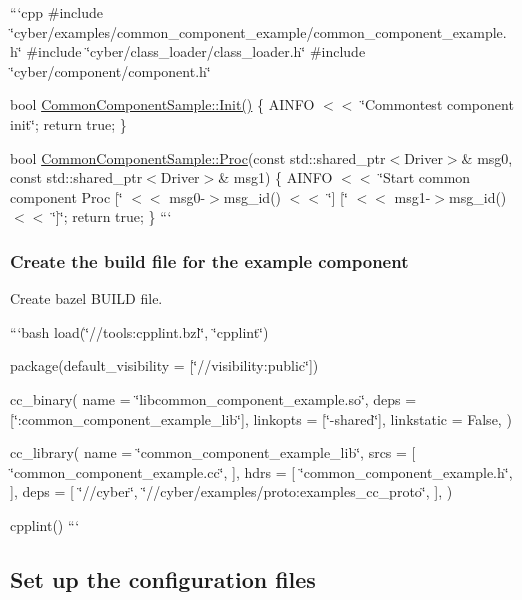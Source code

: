 ```cpp \#include \char`\"{}cyber/examples/common\-\_\-component\-\_\-example/common\-\_\-component\-\_\-example.\-h\char`\"{} \#include \char`\"{}cyber/class\-\_\-loader/class\-\_\-loader.\-h\char`\"{} \#include \char`\"{}cyber/component/component.\-h\char`\"{}

bool \hyperlink{classCommonComponentSample_ae2a3f8c8ce4b9cfd9c6b357628bc84ee}{Common\-Component\-Sample\-::\-Init()} \{ A\-I\-N\-F\-O $<$$<$ \char`\"{}\-Commontest component init\char`\"{}; return true; \}

bool \hyperlink{classCommonComponentSample_ab84ea2f74b8ab92a74733b392319ea5e}{Common\-Component\-Sample\-::\-Proc}(const std\-::shared\-\_\-ptr$<$\-Driver$>$\& msg0, const std\-::shared\-\_\-ptr$<$\-Driver$>$\& msg1) \{ A\-I\-N\-F\-O $<$$<$ \char`\"{}\-Start common component Proc \mbox{[}\char`\"{} $<$$<$ msg0-\/$>$msg\-\_\-id() $<$$<$ \char`\"{}\mbox{]} \mbox{[}\char`\"{} $<$$<$ msg1-\/$>$msg\-\_\-id() $<$$<$ \char`\"{}\mbox{]}\char`\"{}; return true; \} ```

\subsubsection*{Create the build file for the example component}

Create bazel B\-U\-I\-L\-D file.

```bash load(\char`\"{}//tools\-:cpplint.\-bzl\char`\"{}, \char`\"{}cpplint\char`\"{})

package(default\-\_\-visibility = \mbox{[}\char`\"{}//visibility\-:public\char`\"{}\mbox{]})

cc\-\_\-binary( name = \char`\"{}libcommon\-\_\-component\-\_\-example.\-so\char`\"{}, deps = \mbox{[}\char`\"{}\-:common\-\_\-component\-\_\-example\-\_\-lib\char`\"{}\mbox{]}, linkopts = \mbox{[}\char`\"{}-\/shared\char`\"{}\mbox{]}, linkstatic = False, )

cc\-\_\-library( name = \char`\"{}common\-\_\-component\-\_\-example\-\_\-lib\char`\"{}, srcs = \mbox{[} \char`\"{}common\-\_\-component\-\_\-example.\-cc\char`\"{}, \mbox{]}, hdrs = \mbox{[} \char`\"{}common\-\_\-component\-\_\-example.\-h\char`\"{}, \mbox{]}, deps = \mbox{[} \char`\"{}//cyber\char`\"{}, \char`\"{}//cyber/examples/proto\-:examples\-\_\-cc\-\_\-proto\char`\"{}, \mbox{]}, )

cpplint() ``` \subsection*{Set up the configuration files}


